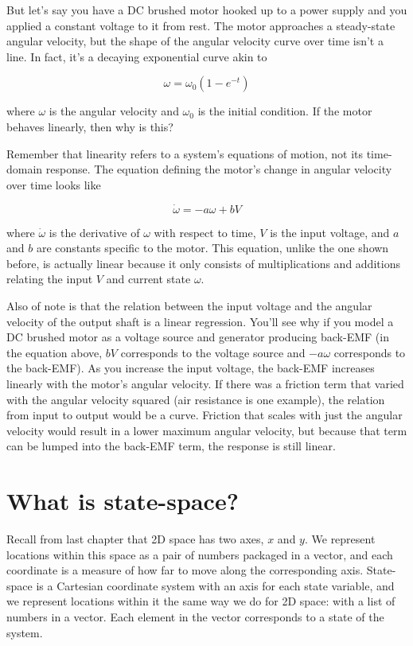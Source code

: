 But let's say you have a DC brushed motor hooked up to a power supply and you
applied a constant voltage to it from rest. The motor approaches a steady-state
angular velocity, but the shape of the angular velocity curve over time isn't a
line. In fact, it's a decaying exponential curve akin to

\begin{equation*}
  \omega = \omega_0\left(1 - e^{-t}\right)
\end{equation*}

where $\omega$ is the angular velocity and $\omega_0$ is the initial condition.
If the motor behaves linearly, then why is this?

Remember that linearity refers to a system's equations of motion, not its
time-domain response. The equation defining the motor's change in angular
velocity over time looks like

\begin{equation*}
  \dot{\omega} = -a\omega + bV
\end{equation*}

where $\dot{\omega}$ is the derivative of $\omega$ with respect to time, $V$ is
the input voltage, and $a$ and $b$ are constants specific to the motor. This
equation, unlike the one shown before, is actually linear because it only
consists of multiplications and additions relating the input $V$ and current
state $\omega$.

Also of note is that the relation between the input voltage and the angular
velocity of the output shaft is a linear regression. You'll see why if you model
a DC brushed motor as a voltage source and generator producing back-EMF (in the
equation above, $bV$ corresponds to the voltage source and $-a\omega$
corresponds to the back-EMF). As you increase the input voltage, the back-EMF
increases linearly with the motor's angular velocity. If there was a friction
term that varied with the angular velocity squared (air resistance is one
example), the relation from input to output would be a curve. Friction that
scales with just the angular velocity would result in a lower maximum angular
velocity, but because that term can be lumped into the back-EMF term, the
response is still linear.

\section{What is state-space?}

Recall from last chapter that 2D space has two axes, $x$ and $y$. We represent
locations within this space as a pair of numbers packaged in a vector, and each
coordinate is a measure of how far to move along the corresponding axis.
State-space is a Cartesian coordinate system with an axis for each \gls{state}
variable, and we represent locations within it the same way we do for 2D space:
with a list of numbers in a vector. Each element in the vector corresponds to a
\gls{state} of the \gls{system}.

